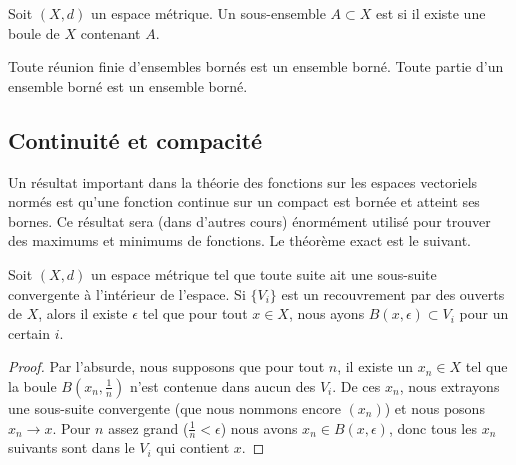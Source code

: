 \begin{definition}\label{DefEnsembleBorne}
	Soit \( (X, d) \) un espace métrique. Un sous-ensemble \( A \subset X\) est  si il existe une boule de \( X\) contenant \( A\).
\end{definition}

\begin{proposition}     \label{PROPooJIOAooWqzKMu}
	Toute réunion finie d'ensembles bornés est un ensemble borné. Toute partie d'un ensemble borné est un ensemble borné.
\end{proposition}


\subsection{Continuité et compacité}

Un résultat important dans la théorie des fonctions sur les espaces vectoriels normés est qu'une fonction continue sur un compact est bornée et atteint ses bornes. Ce résultat sera (dans d'autres cours) énormément utilisé pour trouver des maximums et minimums de fonctions. Le théorème exact est le suivant.

\begin{lemma}    \label{LemQFXOWyx}
	Soit \( (X,d)\) un espace métrique tel que toute suite ait une sous-suite convergente à l'intérieur de l'espace. Si \( \{ V_i \}\) est un recouvrement par des ouverts de \( X\), alors il existe \( \epsilon\) tel que pour tout \( x\in X\), nous ayons \( B(x,\epsilon)\subset V_i\) pour un certain \( i\).
\end{lemma}

\begin{proof}
	Par l'absurde, nous supposons que pour tout \( n\), il existe un \( x_n\in X\) tel que la boule \( B(x_n,\frac{1}{ n })\) n'est contenue dans aucun des \( V_i\). De ces \( x_n\), nous extrayons une sous-suite convergente (que nous nommons encore \( (x_n)\)) et nous posons \( x_n\to x\). Pour \( n\) assez grand (\( \frac{1}{ n }<\epsilon\)) nous avons \( x_n\in B(x,\epsilon)\), donc tous les \( x_n\) suivants sont dans le \( V_i\) qui contient \( x\).
\end{proof}

